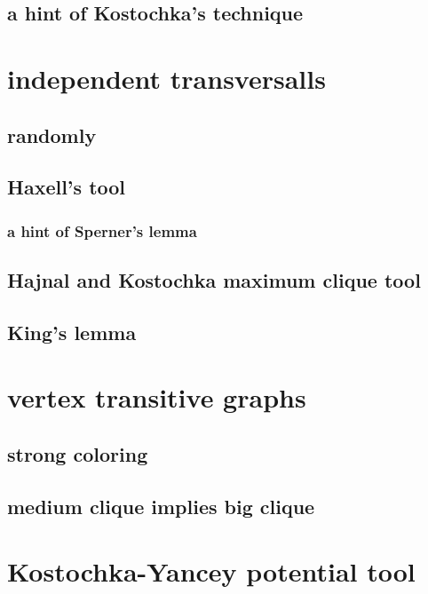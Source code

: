 \documentclass{amsbook}
\theoremstyle{plain}
\numberwithin{equation}{chapter}
\begin{document}
\section*{a hint of Kostochka's technique}

\chapter*{independent transversalls}
\section*{randomly}
\section*{Haxell's tool}
\subsection*{a hint of Sperner's lemma}
\section*{Hajnal and Kostochka maximum clique tool}
\section*{King's lemma}

\chapter*{vertex transitive graphs}
\section*{strong coloring}
\section*{medium clique implies big clique}

\chapter*{Kostochka-Yancey potential tool}
\end{document}
